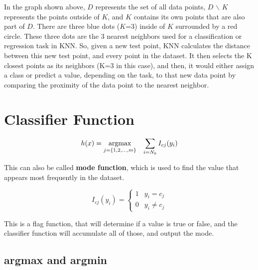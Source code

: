 In the graph shown above, $D$ represents the set of all data points, $D$ $\backslash$ $K$
represents the points outside of $K$, and $K$ contains its own points that are also part of $D$.
There are three blue dots ($K$=3) inside of $K$ surrounded by a red circle. These three
dots are the 3 nearest neighbors used for a classification or regression task in KNN. So,
given a new test point, KNN calculates the distance between this new test point, and every point in the dataset.
It then selects the K closest points as its neighbors (K=3 in this case), and then, it would either assign a class
or predict a value, depending on the task, to that new data point by comparing the proximity of the data point to the
nearest neighbor.


\section{Classifier Function}

\[
    h(x) = \operatorname*{argmax}\limits_{\substack{j = \{1,2,\dots,m\}}} \hspace{3mm} \sum_{i=N_k} I_{cj}(y_i)
\]

This can also be called \textbf{mode function}, which is used to find the value that appears most frequently in the dataset.

\[
I_{cj} (y_i) = 
\begin{cases}
    1 & y_i = c_j\\
    0 & y_i \neq c_j
\end{cases}
\]

This is a flag function, that will determine if a value is true or false, and the classifier function will accumulate all of
those, and output the mode.

\subsection{argmax and argmin}

